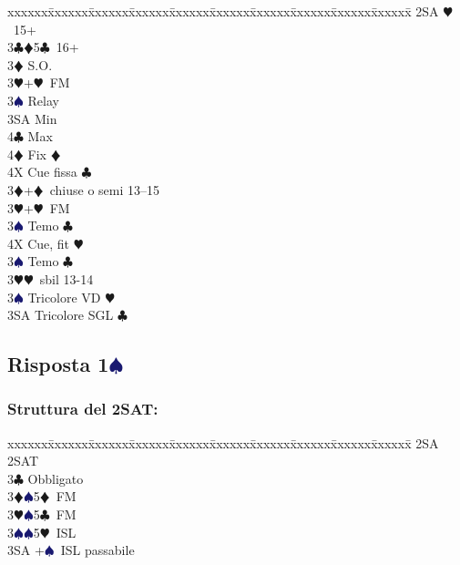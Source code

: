 \documentclass[a4paper,italian]{article}
\newcommand{\BC}{\textcolor{OliveGreen}{$\clubsuit$}}
\newcommand{\BD}{\textcolor{RedOrange}{$\vardiamondsuit$}}
\newcommand{\BH}{\textcolor{Red2}{$\varheartsuit${}}}
\newcommand{\BS}{\textcolor{MidnightBlue}{$\spadesuit${}}}
\newcommand{\pdfs}{\texorpdfstring{\BS{}}{S}}
\newenvironment{bidtable}
{\begin{tabbing}

    xxxxxx\=xxxxxx\=xxxxxx\=xxxxxx\=xxxxxx\=xxxxxx\=xxxxxx\=xxxxxx\=xxxxxx\=xxxxxx\=\kill}
{\end{tabbing} }%
\begin{document}
\begin{multicols}{2}
\begin{bidtable}
                                            2SA \BH\ 15+\\
                                            3\BC {}\BD 5\BC\ 16+\+\\
                                            3\BD \> S.O.\\
                                            3\BH {}+\BH\ FM\\
                                            3\BS \> Relay\+\\
                                            3SA \> Min\\
                                            4\BC \> Max\+\\
                                            4\BD \> Fix \BD \\
                                            4X \> Cue fissa \BC \-\-\-\\
                                            3\BD {}+\BD\ chiuse o semi 13--15\+\\
                                            3\BH {}+\BH\ FM\+\\
                                            3\BS \> Temo \BC \\
                                            4X \> Cue, fit \BH \-\\
                                            3\BS \> Temo \BC \-\\
                                            3\BH {}\BH\ sbil 13-14\\
                                            3\BS \> Tricolore VD \BH \\
                                            3SA \> Tricolore SGL \BC \-
                                        \end{bidtable}

                                        \subsection{Risposta 1\pdfs}


                                        \subsubsection{Struttura del 2SAT:}

                                        \begin{bidtable}
                                            2SA \> 2SAT\+\\
                                            3\BC \> Obbligato\+\\
                                            3\BD {}\BS 5\BD\ FM\\
                                            3\BH {}\BS 5\BC\ FM\\
                                            3\BS {}\BS 5\BH\ ISL\\
                                            3SA +\BS\ ISL passabile\-\-
                                        \end{bidtable}


\end{multicols}
\end{document}
